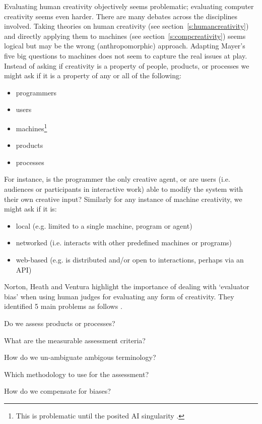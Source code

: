 Evaluating human creativity objectively seems problematic; evaluating computer creativity seems even harder. There are many debates across the disciplines involved. Taking theories on human creativity (see section~\ref{s:humancreativity}) and directly applying them to machines (see section~\ref{s:compcreativity}) seems logical but may be the wrong (anthropomorphic) approach. Adapting Mayer's five big questions \autocite*{Mayer1999} to machines does not seem to capture the real issues at play. Instead of asking if creativity is a property of people, products, or processes we might ask if it is a property of any or all of the following:

\begin{itemize}
  \item programmers
  \item users
  \item machines\footnote{This is problematic until the posited \ac{AI} singularity \autocite{Schmidhuber2006a}.}
  \item products
  \item processes
\end{itemize}

For instance, is the programmer the only creative agent, or are users (i.e. audiences or participants in interactive work) able to modify the system with their own creative input? Similarly for any instance of machine creativity, we might ask if it is:

\begin{itemize}
  \item local (e.g. limited to a single machine, program or agent)
  \item networked (i.e. interacts with other predefined machines or programs)
  \item web-based (e.g. is distributed and/or open to interactions, perhaps via an API)
\end{itemize}

Norton, Heath and Ventura highlight the importance of dealing with `evaluator bias' when using human judges for evaluating any form of creativity. They identified 5 main problems as follows \autocite*{Norton2015}. 

\begin{description}[leftmargin=3.5cm]
  \item[$1^{st}$ problem] Do we assess products or processes?
  \item[$2^{nd}$ problem] What are the measurable assessment criteria?
  \item[$3^{rd}$ problem] How do we un-ambiguate ambigous terminology?
  \item[$4^{th}$ problem] Which methodology to use for the assessment?
  \item[$5^{th}$ problem] How do we compensate for biases?
\end{description}

